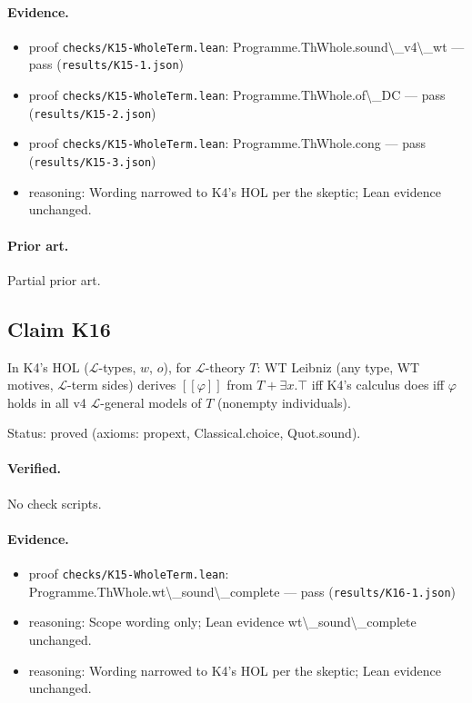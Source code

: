 \documentclass{article}
\begin{document}
\paragraph{Evidence.}
\begin{itemize}
\item proof \texttt{checks/K15-WholeTerm.lean}: Programme.ThWhole.sound\textbackslash{}\_v4\textbackslash{}\_wt --- pass (\texttt{results/K15-1.json})
\item proof \texttt{checks/K15-WholeTerm.lean}: Programme.ThWhole.of\textbackslash{}\_DC --- pass (\texttt{results/K15-2.json})
\item proof \texttt{checks/K15-WholeTerm.lean}: Programme.ThWhole.cong --- pass (\texttt{results/K15-3.json})
\item reasoning: Wording narrowed to K4's HOL per the skeptic; Lean evidence unchanged.
\end{itemize}

\paragraph{Prior art.} Partial prior art.

\subsection*{Claim K16}

In K4's HOL ($\mathcal L$-types, $w$, $o$), for $\mathcal L$-theory $T$: WT Leibniz (any type, WT motives, $\mathcal L$-term sides) derives $[\![\varphi]\!]$ from $T+\exists x.\top$ iff K4's calculus does iff $\varphi$ holds in all v4 $\mathcal L$-general models of $T$ (nonempty individuals).

Status: proved (axioms: propext, Classical.choice, Quot.sound).

\paragraph{Verified.}
No check scripts.

\paragraph{Evidence.}
\begin{itemize}
\item proof \texttt{checks/K15-WholeTerm.lean}: Programme.ThWhole.wt\textbackslash{}\_sound\textbackslash{}\_complete --- pass (\texttt{results/K16-1.json})
\item reasoning: Scope wording only; Lean evidence wt\textbackslash{}\_sound\textbackslash{}\_complete unchanged.
\item reasoning: Wording narrowed to K4's HOL per the skeptic; Lean evidence unchanged.
\end{itemize}
\end{document}
